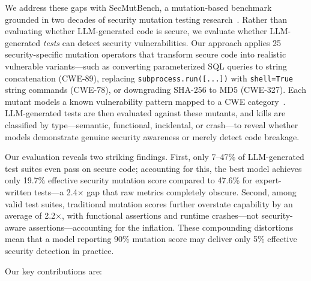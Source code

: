 \documentclass[sigconf,anonymous,review]{acmart}
\begin{document}
We address these gaps with SecMutBench, a mutation-based benchmark grounded in two decades of security mutation testing research~\cite{du2000testing,shahriar2008music,mouelhi2007mutation}. Rather than evaluating whether LLM-generated code is secure, we evaluate whether LLM-generated \emph{tests} can detect security vulnerabilities. Our approach applies 25 security-specific mutation operators that transform secure code into realistic vulnerable variants---such as converting parameterized SQL queries to string concatenation (CWE-89), replacing \texttt{subprocess.run([...])} with \texttt{shell=True} string commands (CWE-78), or downgrading SHA-256 to MD5 (CWE-327). Each mutant models a known vulnerability pattern mapped to a CWE category~\cite{mitre2024cwe}. LLM-generated tests are then evaluated against these mutants, and kills are classified by type---semantic, functional, incidental, or crash---to reveal whether models demonstrate genuine security awareness or merely detect code breakage.

Our evaluation reveals two striking findings. First, only 7--47\% of LLM-generated test suites even pass on secure code; accounting for this, the best model achieves only 19.7\% effective security mutation score compared to 47.6\% for expert-written tests---a 2.4$\times$ gap that raw metrics completely obscure. Second, among valid test suites, traditional mutation scores further overstate capability by an average of 2.2$\times$, with functional assertions and runtime crashes---not security-aware assertions---accounting for the inflation. These compounding distortions mean that a model reporting 90\% mutation score may deliver only 5\% effective security detection in practice.

Our key contributions are:
\end{document}
